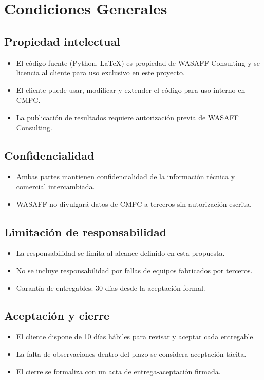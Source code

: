 \documentclass[11pt,a4paper]{article}
\begin{document}
\newpage

\section{Condiciones Generales}

\subsection{Propiedad intelectual}
\begin{itemize}
  \item El código fuente (Python, LaTeX) es propiedad de WASAFF Consulting y se licencia al cliente para uso exclusivo en este proyecto.
  \item El cliente puede usar, modificar y extender el código para uso interno en CMPC.
  \item La publicación de resultados requiere autorización previa de WASAFF Consulting.
\end{itemize}

\subsection{Confidencialidad}
\begin{itemize}
  \item Ambas partes mantienen confidencialidad de la información técnica y comercial intercambiada.
  \item WASAFF no divulgará datos de CMPC a terceros sin autorización escrita.
\end{itemize}

\subsection{Limitación de responsabilidad}
\begin{itemize}
  \item La responsabilidad se limita al alcance definido en esta propuesta.
  \item No se incluye responsabilidad por fallas de equipos fabricados por terceros.
  \item Garantía de entregables: 30 días desde la aceptación formal.
\end{itemize}

\subsection{Aceptación y cierre}
\begin{itemize}
  \item El cliente dispone de 10 días hábiles para revisar y aceptar cada entregable.
  \item La falta de observaciones dentro del plazo se considera aceptación tácita.
  \item El cierre se formaliza con un acta de entrega-aceptación firmada.
\end{itemize}
\end{document}

